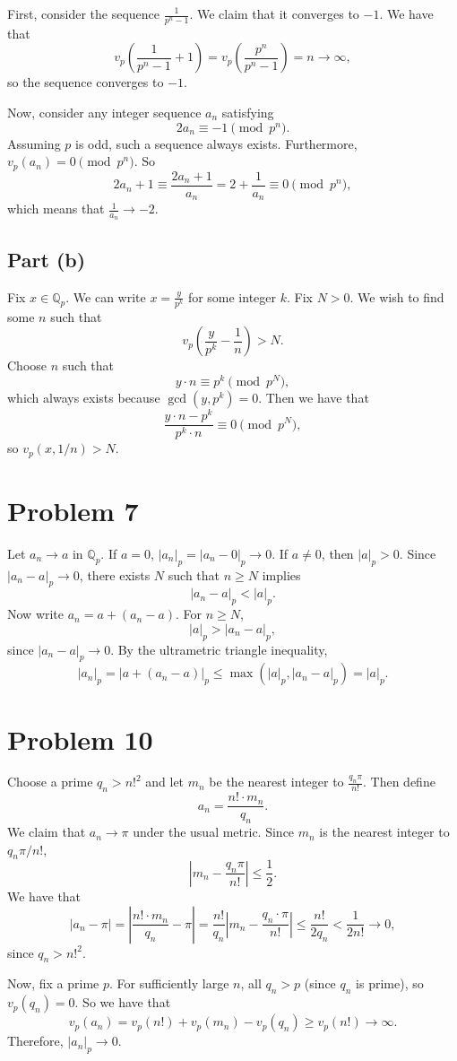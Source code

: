 \documentclass{article}
\newcommand{\Q}{\mathbb{Q}}
\newcommand{\bigp}[1]{\left(#1\right)}
\newcommand{\bigabs}[1]{\left|#1\right|}
\begin{document}
First, consider the sequence $\frac{1}{p^n - 1}$. We claim that it converges to $-1$. We have that
$$v_p\bigp{\frac{1}{p^n - 1} + 1} = v_p\bigp{\frac{p^n}{p^n - 1}} = n \to \infty,$$
so the sequence converges to $-1$.

Now, consider any integer sequence $a_n$ satisfying
$$2a_n \equiv -1 \pmod{p^n}.$$
Assuming $p$ is odd, such a sequence always exists. Furthermore, $v_p(a_n) = 0 \pmod{p^n}$. So
$$2a_n + 1 \equiv \frac{2a_n + 1}{a_n} = 2 + \frac{1}{a_n} \equiv 0 \pmod{p^n},$$
which means that $\frac{1}{a_n} \to -2$.

\subsection*{Part (b)}
Fix $x \in \Q_p$. We can write $x = \frac{y}{p^k}$ for some integer $k$. Fix $N > 0$. We wish to find some $n$ such that
$$v_p\bigp{\frac{y}{p^k} - \frac{1}{n}} > N.$$
Choose $n$ such that
$$y\cdot n \equiv p^k \pmod{p^N},$$
which always exists because $\gcd(y, p^k) = 0$. Then we have that
$$\frac{y\cdot n - p^k}{p^k\cdot n} \equiv 0 \pmod{p^N},$$
so $v_p(x, 1/n) > N$.

\section*{Problem 7}
Let $a_n \to a$ in $\Q_p$. If $a = 0$, $|a_n|_p = |a_n - 0|_p \to 0$. If $a \neq 0$, then $|a|_p > 0$. Since $|a_n - a|_p \to 0$, there exists $N$ such that $n \ge N$ implies
$$|a_n - a|_p < |a|_p.$$
Now write $a_n = a + (a_n - a)$. For $n \ge N$,
$$|a|_p > |a_n - a|_p,$$
since $|a_n - a|_p \to 0$. By the ultrametric triangle inequality,
$$|a_n|_p = |a + (a_n - a)|_p \le \max(|a|_p, |a_n - a|_p) = |a|_p.$$

\section*{Problem 10}
Choose a prime $q_n > n!^2$ and let $m_n$ be the nearest integer to $\frac{q_n\pi}{n!}$. Then define
$$a_n = \frac{n! \cdot m_n}{q_n}.$$
We claim that $a_n \to \pi$ under the usual metric. Since $m_n$ is the nearest integer to $q_n\pi/n!$,
$$\bigabs{m_n - \frac{q_n\pi}{n!}} \le \frac{1}{2}.$$
We have that
$$|a_n - \pi| = \bigabs{\frac{n! \cdot m_n}{q_n} - \pi} = \frac{n!}{q_n}\bigabs{m_n - \frac{q_n\cdot \pi}{n!}} \le \frac{n!}{2q_n} < \frac{1}{2n!} \to 0,$$
since $q_n > n!^2$.

Now, fix a prime $p$. For sufficiently large $n$, all $q_n > p$ (since $q_n$ is prime), so $v_p(q_n) = 0$. So we have that
$$v_p(a_n) = v_p(n!) + v_p(m_n) - v_p(q_n) \ge v_p(n!) \to \infty.$$
Therefore, $|a_n|_p \to 0$.
\end{document}
